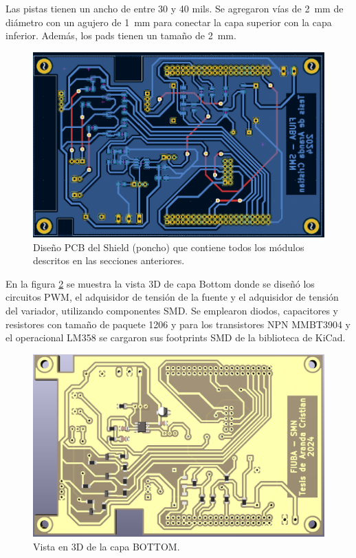Las pistas tienen un ancho de entre 30 y 40 mils. Se agregaron vías de \SI{2}{\milli\meter} de diámetro con un agujero de \SI{1}{\milli\meter} para conectar la capa superior con la capa inferior. Además, los pads tienen un tamaño de \SI{2}{\milli\meter}.


\begin{figure}[H]
    \centering
    \includegraphics[width=0.95\linewidth]{Figuras/datalogger/Hardware/pcbDesing.png}
    \caption{Diseño PCB del Shield (poncho) que contiene todos los módulos descritos en las secciones anteriores.}
    \label{fig:pcbDesing}
\end{figure}

En la figura \ref{fig:pcb3dBottom} se muestra la vista 3D de capa Bottom donde se diseñó los circuitos PWM, el adquisidor de tensión de la fuente y el adquisidor de tensión del variador, utilizando componentes SMD. Se emplearon diodos, capacitores y resistores con tamaño de paquete 1206 y para los transistores NPN MMBT3904 y el operacional LM358 se cargaron sus footprints SMD de la biblioteca de KiCad.


\begin{figure}[H]
    \centering
    \includegraphics[width=0.95\linewidth]{Figuras/datalogger/Hardware/pcb3dBottom.png}
    \caption{Vista en 3D de la capa BOTTOM.}
    \label{fig:pcb3dBottom}
\end{figure}

